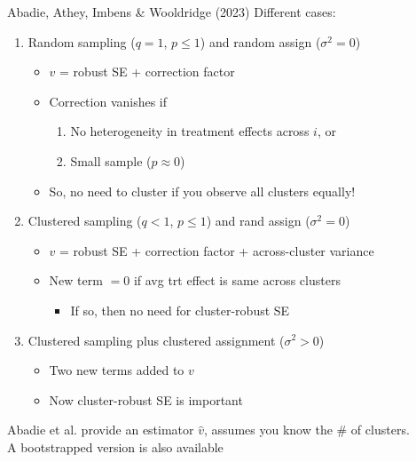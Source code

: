 \begin{frame}{Abadie, Athey, Imbens \& Wooldridge
(2023)}
Different cases:
\begin{enumerate}
    \item Random sampling ($q=1$, $p\leq 1$) and random assign ($\sigma^2=0$)
    \begin{itemize}
        \item $v$ = robust SE + correction factor
        \item Correction vanishes if
        \begin{enumerate}
            \item No heterogeneity in treatment effects across $i$, or
            \item Small sample ($p\approx 0$)
        \end{enumerate}
        \item So, no need to cluster if you observe all clusters equally!
    \end{itemize}
    \item Clustered sampling ($q<1$, $p\leq 1$) and rand assign ($\sigma^2=0$)
    \begin{itemize}
        \item $v$ = robust SE + correction factor + across-cluster variance
        \item New term $=0$ if avg trt effect is same across clusters
        \begin{itemize}
            \item If so, then no need for cluster-robust SE
        \end{itemize}
    \end{itemize}
    \item Clustered sampling plus clustered assignment ($\sigma^2>0$)
    \begin{itemize}
        \item Two new terms added to $v$
        \item Now cluster-robust SE is important
    \end{itemize}
\end{enumerate}
Abadie et al. provide an estimator $\hat{v}$, assumes you know the \# of clusters.\\
A bootstrapped version is also available
\end{frame}

